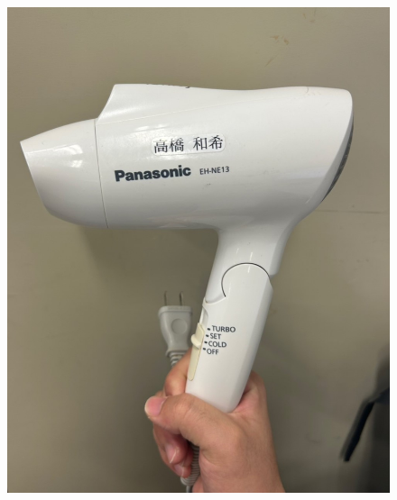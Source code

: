 \begin{figure}
\begin{minipage}[b]{0.29\hsize}
  \end{minipage}
  \begin{minipage}[b]{0.19\hsize}
    \centering
    \includegraphics[scale=0.1]{pic/dara.jpg}
  

\end{minipage}
\end{figure}
